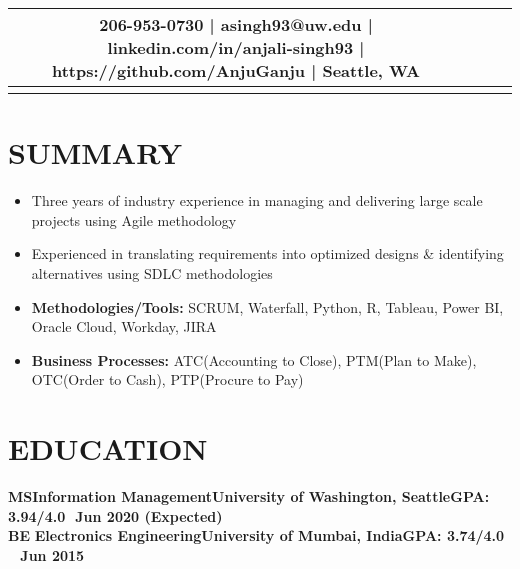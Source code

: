 \documentclass[11.5pt,a4paper,roman]{moderncv}        %
\begin{document}
\makecvtitle
\vspace*{-19mm}

\begin{center}
\begin{tabular}{ c c c c }
   206-953-0730  | asingh93@uw.edu | linkedin.com/in/anjali-singh93 | https://github.com/AnjuGanju | Seattle, WA \\  
\hline
\vspace*{-7mm}
\end{tabular}
\end{center}


\section{\large SUMMARY}

\vspace{-1mm} 
\begin{itemize}
\renewcommand{\labelitemi}{$\bullet$}
\item Three years of industry experience in managing and delivering large scale projects using Agile methodology
\item Experienced in translating requirements into optimized designs \& identifying alternatives using SDLC methodologies
 \item \textbf{Methodologies/Tools:} SCRUM, Waterfall, Python, R, Tableau, Power BI, Oracle Cloud, Workday, JIRA 
 \item \textbf{Business Processes:} ATC(Accounting to Close), PTM(Plan to Make), OTC(Order to Cash), PTP(Procure to Pay)
 \end{itemize}
 \vspace{-3mm} 

\section{\large EDUCATION}


\textbf{MS\quad\quad Information Management\quad\quad University of Washington, Seattle\quad\quad GPA: 3.94/4.0\quad\,\, Jun 2020 (Expected)\\}
\textbf{BE\quad\quad\,\,Electronics Engineering\quad\quad\quad University of Mumbai, India\quad\quad\quad\quad GPA: 3.74/4.0 \quad\quad\quad\quad\quad\,\,\, Jun 2015\\}
 \vspace{-8mm} 
\end{document}
